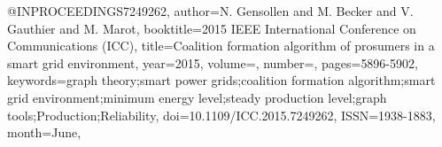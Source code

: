 @INPROCEEDINGS{7249262, 
author={N. {Gensollen} and M. {Becker} and V. {Gauthier} and M. {Marot}}, 
booktitle={2015 IEEE International Conference on Communications (ICC)}, 
title={Coalition formation algorithm of prosumers in a smart grid environment}, 
year={2015}, 
volume={}, 
number={}, 
pages={5896-5902}, 
keywords={graph theory;smart power grids;coalition formation algorithm;smart grid environment;minimum energy level;steady production level;graph tools;Production;Reliability}, 
doi={10.1109/ICC.2015.7249262}, 
ISSN={1938-1883}, 
month={June},}
